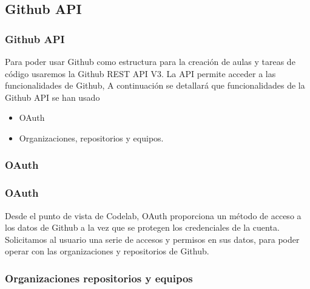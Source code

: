 \documentclass{beamer}
\begin{document}
\subsection{Github API}
\begin{frame}
\frametitle{Github API}
  
  Para poder usar Github como estructura para la creación de aulas y tareas de código usaremos 
  la Github REST API V3. La API permite acceder a las funcionalidades de Github, 
  A continuación se detallará que funcionalidades de la Github API se han usado

  \begin{itemize}
    \item OAuth
    \item Organizaciones, repositorios y equipos.
  \end{itemize}
  
\end{frame}
  
\subsubsection{OAuth}
  
\begin{frame}
\frametitle{OAuth}

  Desde el punto de vista de Codelab, OAuth proporciona un método de acceso a los datos de Github 
  a la vez que se protegen los credenciales de la cuenta. Solicitamos al usuario una serie de 
  accesos y permisos en sus datos, para poder operar con las organizaciones y repositorios de Github.
  
\end{frame}
  
\subsubsection{Organizaciones repositorios y equipos}
\end{document}

